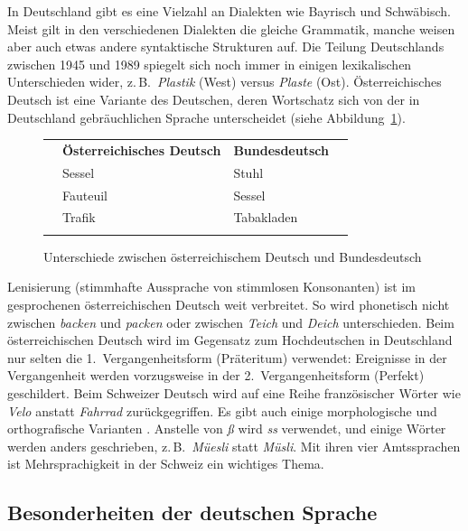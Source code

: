 \begin{multicols}{2}
In Deutschland gibt es eine Vielzahl an Dialekten wie Bayrisch und Schwäbisch. Meist gilt in den verschiedenen Dialekten die gleiche Grammatik, manche weisen aber auch etwas andere syntaktische Strukturen auf. Die Teilung Deutschlands zwischen 1945 und 1989 spiegelt sich noch immer in einigen lexikalischen Unterschieden wider, z.\,B.~\textit{Plastik} (West) versus \textit{Plaste} (Ost). Österreichisches Deutsch ist eine Variante des Deutschen, deren Wortschatz sich von der in Deutschland gebräuchlichen Sprache unterscheidet (siehe Abbildung~\ref{atgetabelle_de}).
\begin{figure}[tb]
  \setlength{\tabcolsep}{3.3em}
  \begin{tabularx}{\textwidth}{llll} \toprule\addlinespace
    & \textbf{Österreichisches Deutsch} & \textbf{Bundesdeutsch} & \\ 
\addlinespace\midrule\addlinespace
    & Sessel   & Stuhl      & \\ 
    & Fauteuil & Sessel     & \\ 
    & Trafik   & Tabakladen & \\ \addlinespace\bottomrule
  \end{tabularx}
  \caption{Unterschiede zwischen österreichischem Deutsch und Bundesdeutsch}
  \label{atgetabelle_de}
\end{figure} 

Lenisierung (stimmhafte Aussprache von stimmlosen Konsonanten) ist im gesprochenen österreichischen Deutsch weit verbreitet. So wird phonetisch nicht zwischen \textit{backen} und \textit{packen} oder zwischen \textit{Teich} und \textit{Deich} unterschieden. Beim österreichischen Deutsch wird im Gegensatz zum Hochdeutschen in Deutschland nur selten die 1.~Vergangenheitsform (Präteritum) verwendet: Ereignisse in der Vergangenheit werden vorzugsweise in der 2.~Vergangenheitsform (Perfekt) geschildert. 
Beim Schweizer Deutsch wird auf eine Reihe französischer Wörter wie \textit{Velo} anstatt \textit{Fahrrad} zurückgegriffen. Es gibt auch einige morphologische und orthografische Varianten \cite{Cano1}. Anstelle von \textit{ß} wird \textit{ss} verwendet, und einige Wörter werden anders geschrieben, z.\,B.~\textit{Müesli} statt \textit{Müsli}. Mit ihren vier Amtssprachen ist Mehrsprachigkeit in der Schweiz ein wichtiges Thema.

\subsection{Besonderheiten der deutschen Sprache}


\end{multicols}
